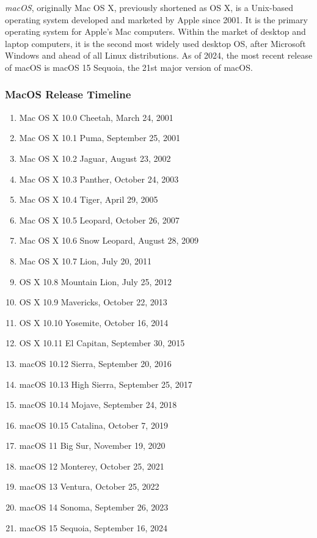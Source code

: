 \textit{macOS}, originally Mac OS X, previously shortened as OS X, is a Unix-based operating system developed and marketed by Apple since 2001. It is the primary operating system for Apple's Mac computers. Within the market of desktop and laptop computers, it is the second most widely used desktop OS, after Microsoft Windows and ahead of all Linux distributions. As of 2024, the most recent release of macOS is macOS 15 Sequoia, the 21st major version of macOS. \cite{wikipediaMacOSVersion, wikipediaMacOSWikipedia, setappFullList}

\subsubsection{MacOS Release Timeline}

\begin{enumerate}
    \item Mac OS X 10.0 Cheetah, March 24, 2001
    \item Mac OS X 10.1 Puma, September 25, 2001
    \item Mac OS X 10.2 Jaguar, August 23, 2002
    \item Mac OS X 10.3 Panther, October 24, 2003
    \item Mac OS X 10.4 Tiger, April 29, 2005
    \item Mac OS X 10.5 Leopard, October 26, 2007
    \item Mac OS X 10.6 Snow Leopard, August 28, 2009
    \item Mac OS X 10.7 Lion, July 20, 2011
    \item OS X 10.8 Mountain Lion, July 25, 2012
    \item OS X 10.9 Mavericks, October 22, 2013
    \item OS X 10.10 Yosemite, October 16, 2014
    \item OS X 10.11 El Capitan, September 30, 2015
    \item macOS 10.12 Sierra, September 20, 2016
    \item macOS 10.13 High Sierra, September 25, 2017
    \item macOS 10.14 Mojave, September 24, 2018
    \item macOS 10.15 Catalina, October 7, 2019
    \item macOS 11 Big Sur, November 19, 2020
    \item macOS 12 Monterey, October 25, 2021
    \item macOS 13 Ventura, October 25, 2022
    \item macOS 14 Sonoma, September 26, 2023
    \item macOS 15 Sequoia, September 16, 2024
\end{enumerate}

